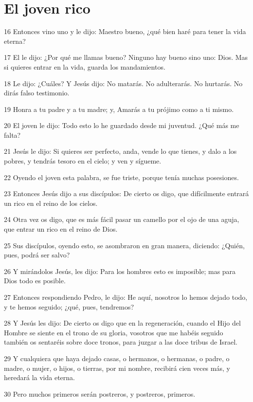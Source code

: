 \section*{El joven rico}

\par 16 Entonces vino uno y le dijo: Maestro bueno, ¿qué bien haré para tener la vida eterna?
\par 17 El le dijo: ¿Por qué me llamas bueno? Ninguno hay bueno sino uno: Dios. Mas si quieres entrar en la vida, guarda los mandamientos.
\par 18 Le dijo: ¿Cuáles? Y Jesús dijo: No matarás. No adulterarás. No hurtarás. No dirás falso testimonio.
\par 19 Honra a tu padre y a tu madre; y, Amarás a tu prójimo como a ti mismo.
\par 20 El joven le dijo: Todo esto lo he guardado desde mi juventud. ¿Qué más me falta?
\par 21 Jesús le dijo: Si quieres ser perfecto, anda, vende lo que tienes, y dalo a los pobres, y tendrás tesoro en el cielo; y ven y sígueme.
\par 22 Oyendo el joven esta palabra, se fue triste, porque tenía muchas posesiones.
\par 23 Entonces Jesús dijo a sus discípulos: De cierto os digo, que difícilmente entrará un rico en el reino de los cielos.
\par 24 Otra vez os digo, que es más fácil pasar un camello por el ojo de una aguja, que entrar un rico en el reino de Dios.
\par 25 Sus discípulos, oyendo esto, se asombraron en gran manera, diciendo: ¿Quién, pues, podrá ser salvo?
\par 26 Y mirándolos Jesús, les dijo: Para los hombres esto es imposible; mas para Dios todo es posible.
\par 27 Entonces respondiendo Pedro, le dijo: He aquí, nosotros lo hemos dejado todo, y te hemos seguido; ¿qué, pues, tendremos?
\par 28 Y Jesús les dijo: De cierto os digo que en la regeneración, cuando el Hijo del Hombre se siente en el trono de su gloria, vosotros que me habéis seguido también os sentaréis sobre doce tronos, para juzgar a las doce tribus de Israel.
\par 29 Y cualquiera que haya dejado casas, o hermanos, o hermanas, o padre, o madre, o mujer, o hijos, o tierras, por mi nombre, recibirá cien veces más, y heredará la vida eterna.
\par 30 Pero muchos primeros serán postreros, y postreros, primeros.

